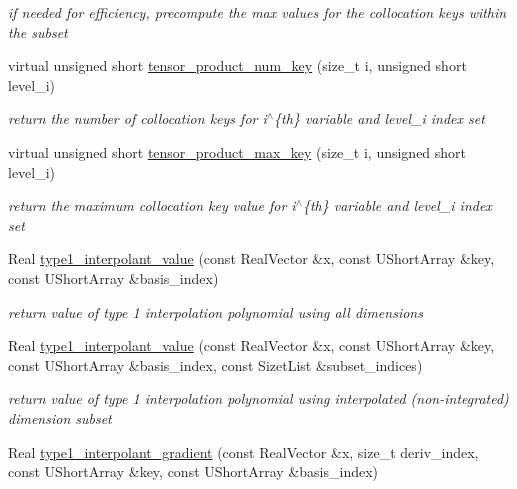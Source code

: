 \begin{DoxyCompactItemize}
\begin{DoxyCompactList}\small\item\em if needed for efficiency, precompute the max values for the collocation keys within the subset \end{DoxyCompactList}\item 
virtual unsigned short \hyperlink{classPecos_1_1SharedInterpPolyApproxData_aebc21f7540417a6aa2671b7ead1ff376}{tensor\+\_\+product\+\_\+num\+\_\+key} (size\+\_\+t i, unsigned short level\+\_\+i)
\begin{DoxyCompactList}\small\item\em return the number of collocation keys for i$^\wedge$\{th\} variable and level\+\_\+i index set \end{DoxyCompactList}\item 
virtual unsigned short \hyperlink{classPecos_1_1SharedInterpPolyApproxData_a48c241725ff74c5f3d500b287cb5d5b5}{tensor\+\_\+product\+\_\+max\+\_\+key} (size\+\_\+t i, unsigned short level\+\_\+i)
\begin{DoxyCompactList}\small\item\em return the maximum collocation key value for i$^\wedge$\{th\} variable and level\+\_\+i index set \end{DoxyCompactList}\item 
Real \hyperlink{classPecos_1_1SharedInterpPolyApproxData_a835514f9023eedb9649e08b9f6ef9bc6}{type1\+\_\+interpolant\+\_\+value} (const Real\+Vector \&x, const U\+Short\+Array \&key, const U\+Short\+Array \&basis\+\_\+index)\label{classPecos_1_1SharedInterpPolyApproxData_a835514f9023eedb9649e08b9f6ef9bc6}

\begin{DoxyCompactList}\small\item\em return value of type 1 interpolation polynomial using all dimensions \end{DoxyCompactList}\item 
Real \hyperlink{classPecos_1_1SharedInterpPolyApproxData_ae4458706f4d72b79990c2c1e5e9751eb}{type1\+\_\+interpolant\+\_\+value} (const Real\+Vector \&x, const U\+Short\+Array \&key, const U\+Short\+Array \&basis\+\_\+index, const Sizet\+List \&subset\+\_\+indices)
\begin{DoxyCompactList}\small\item\em return value of type 1 interpolation polynomial using interpolated (non-\/integrated) dimension subset \end{DoxyCompactList}\item 
Real \hyperlink{classPecos_1_1SharedInterpPolyApproxData_a28337752c15300b873673c595adb7cc0}{type1\+\_\+interpolant\+\_\+gradient} (const Real\+Vector \&x, size\+\_\+t deriv\+\_\+index, const U\+Short\+Array \&key, const U\+Short\+Array \&basis\+\_\+index)\label{classPecos_1_1SharedInterpPolyApproxData_a28337752c15300b873673c595adb7cc0}


\end{DoxyCompactItemize}
